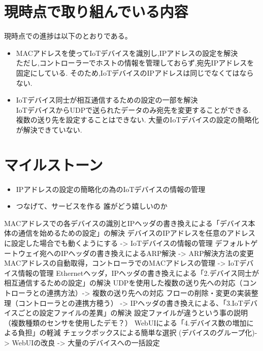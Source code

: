 \documentclass{jsarticle}
\begin{document}
\section{現時点で取り組んでいる内容}
	現時点での進捗は以下のとおりである。
	\begin{itemize}
		\item MACアドレスを使ってIoTデバイスを識別し,IPアドレスの設定を解決\\
			ただし,コントローラーでホストの情報を管理しておらず,宛先IPアドレスを固定にしている.
			そのため,IoTデバイスのIPアドレスは同じでなくてはならない.
		\item IoTデバイス同士が相互通信するための設定の一部を解決\\
			IoTデバイスからUDPで送られたデータのみ宛先を変更することができる.
			複数の送り先を設定することはできない.
			大量のIoTデバイスの設定の簡略化が解決できていない.
	\end{itemize}

\section{マイルストーン}
	\begin{itemize}
		\item IPアドレスの設定の簡略化の為のIoTデバイスの情報の管理
		\item
		つなげて、サービスを作る  誰がどう嬉しいのか
	\end{itemize}
	MACアドレスでの各デバイスの識別とIPヘッダの書き換えによる「デバイス本体の通信を始めるための設定」の解決
		デバイスのIPアドレスを任意のアドレスに設定した場合でも動くようにする ->  IoTデバイスの情報の管理
		デフォルトゲートウェイ宛へのIPヘッダの書き換えによるARP解決 -> ARP解決方法の変更
		MACアドレスの自動取得，コントローラでのMACアドレスの管理 -> IoTデバイス情報の管理
	Ethernetヘッダ，IPヘッダの書き換えによる「2.デバイス同士が相互通信するための設定」の解決
		UDPを使用した複数の送り先への対応（コントローラとの連携方法）-> 複数の送り先への対応
		フローの削除・変更の実装整理（コントローラとの連携方穂う） ->
	IPヘッダの書き換えによる、「3.IoTデバイスごとの設定ファイルの差異」の解決
		設定ファイルが違うという事の説明（複数種類のセンサを使用したデモ？）
	WebUIによる「4.デバイス数の増加による負担」の軽減
	チェックボックスによる簡単な選択
		(デバイスのグループ化)-> WebUIの改良
		-> 大量のデバイスへの一括設定
\end{document}
